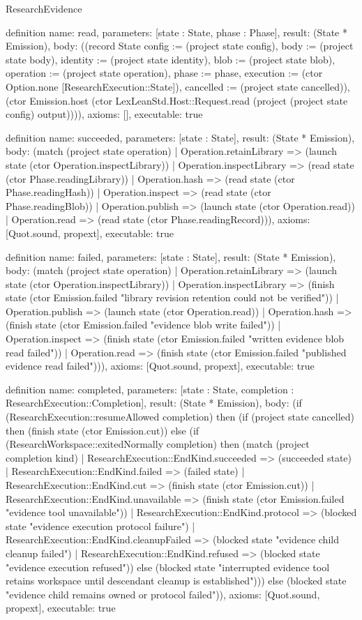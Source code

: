 \begin{lexlean}{ResearchEvidence}
\begin{semanticmodule}
definition{
 name: read,
 parameters: [state : State, phase : Phase],
 result: (State * Emission),
 body: ((record State {config := (project state config), body := (project state body), identity := (project state identity), blob := (project state blob), operation := (project state operation), phase := phase, execution := (ctor Option.none [ResearchExecution::State]), cancelled := (project state cancelled)}), (ctor Emission.host (ctor LexLeanStd.Host::Request.read (project (project state config) output)))),
 axioms: [],
 executable: true
}

definition{
 name: succeeded,
 parameters: [state : State],
 result: (State * Emission),
 body: (match (project state operation) | Operation.retainLibrary => (launch state (ctor Operation.inspectLibrary)) | Operation.inspectLibrary => (read state (ctor Phase.readingLibrary)) | Operation.hash => (read state (ctor Phase.readingHash)) | Operation.inspect => (read state (ctor Phase.readingBlob)) | Operation.publish => (launch state (ctor Operation.read)) | Operation.read => (read state (ctor Phase.readingRecord))),
 axioms: [Quot.sound, propext],
 executable: true
}

definition{
 name: failed,
 parameters: [state : State],
 result: (State * Emission),
 body: (match (project state operation) | Operation.retainLibrary => (launch state (ctor Operation.inspectLibrary)) | Operation.inspectLibrary => (finish state (ctor Emission.failed "library revision retention could not be verified")) | Operation.publish => (launch state (ctor Operation.read)) | Operation.hash => (finish state (ctor Emission.failed "evidence blob write failed")) | Operation.inspect => (finish state (ctor Emission.failed "written evidence blob read failed")) | Operation.read => (finish state (ctor Emission.failed "published evidence read failed"))),
 axioms: [Quot.sound, propext],
 executable: true
}

definition{
 name: completed,
 parameters: [state : State, completion : ResearchExecution::Completion],
 result: (State * Emission),
 body: (if (ResearchExecution::resumeAllowed completion) then (if (project state cancelled) then (finish state (ctor Emission.cut)) else (if (ResearchWorkspace::exitedNormally completion) then (match (project completion kind)
 | ResearchExecution::EndKind.succeeded => (succeeded state)
 | ResearchExecution::EndKind.failed => (failed state)
 | ResearchExecution::EndKind.cut => (finish state (ctor Emission.cut))
 | ResearchExecution::EndKind.unavailable => (finish state (ctor Emission.failed "evidence tool unavailable"))
 | ResearchExecution::EndKind.protocol => (blocked state "evidence execution protocol failure")
 | ResearchExecution::EndKind.cleanupFailed => (blocked state "evidence child cleanup failed")
 | ResearchExecution::EndKind.refused => (blocked state "evidence execution refused")) else (blocked state "interrupted evidence tool retains workspace until descendant cleanup is established"))) else (blocked state "evidence child remains owned or protocol failed")),
 axioms: [Quot.sound, propext],
 executable: true
}


\end{semanticmodule}
\end{lexlean}

